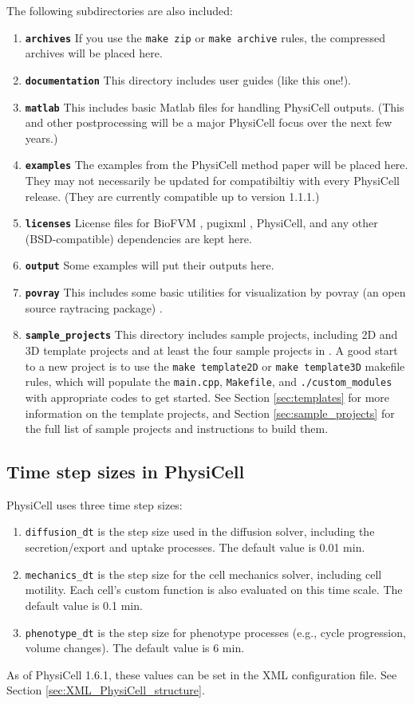 \documentclass[12pt]{article}
\renewcommand{\v}{\verb}
\newcommand{\smallcode}[1]{\textbf{\texttt{#1}}}
\begin{document}
The following subdirectories are also included: 
\begin{enumerate}
\item 
\smallcode{archives} If you use the \v|make zip| or \v|make archive| rules, the compressed archives will be placed here.  
\item 
\smallcode{documentation} This directory includes user guides (like this one!). 
\item 
\smallcode{matlab} This includes basic Matlab files for handling PhysiCell outputs. (This and other postprocessing 
will be a major PhysiCell focus over the next few years.) 
\item
\smallcode{examples} The examples from the PhysiCell method paper will be placed here. They may not 
necessarily be updated for compatibiltiy with every PhysiCell release. (They are currently compatible up to version 
1.1.1.) 
\item 
\smallcode{licenses} License files for BioFVM \cite{ref:BioFVM}, pugixml \cite{ref:pugixml}, PhysiCell, 
and any other (BSD-compatible) dependencies are kept here. 
\item 
\smallcode{output} Some examples will put their outputs here. 
\item 
\smallcode{povray} This includes some basic utilities for visualization by povray (an open source raytracing package) \cite{ref:povray}. 
\item 
\smallcode{sample\_projects} This directory includes sample projects, including 2D and 3D template projects 
and at least the four sample projects in \cite{ref:PhysiCell}.  A good start to a new 
project is to use the \v|make template2D| or \v|make template3D| makefile rules, 
which will populate the \v|main.cpp|, \v|Makefile|, and \v|./custom_modules| with appropriate 
codes to get started. See Section \ref{sec:templates} for more information on the 
template projects, and Section \ref{sec:sample_projects} for the full list of sample 
projects and instructions to build them. 

\end{enumerate}

\subsection{Time step sizes in PhysiCell}
\label{sec:time_steps}
PhysiCell uses three time step sizes: 
\begin{enumerate}
\item 
\v|diffusion_dt| is the step size used in the diffusion solver, including the secretion/export and uptake processes. 
The default value is 0.01 min. 
\item 
\v|mechanics_dt| is the step size for the cell mechanics solver, including cell motility. 
Each cell's custom function is also evaluated on this time scale. The default value is 0.1 min.
\item 
\v|phenotype_dt| is the step size for phenotype processes (e.g., cycle progression, volume changes). 
The default value is 6 min. 
\end{enumerate}
As of PhysiCell 1.6.1, these values can be set in the XML configuration file. See Section 
\ref{sec:XML_PhysiCell_structure}. 
\end{document}
